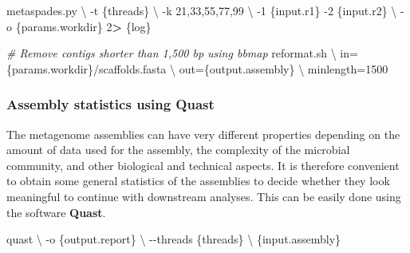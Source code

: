 \documentclass[
]{book}
\newenvironment{Shaded}{\begin{snugshade}}{\end{snugshade}}
\newcommand{\AttributeTok}[1]{\textcolor[rgb]{0.77,0.63,0.00}{#1}}
\newcommand{\CommentTok}[1]{\textcolor[rgb]{0.56,0.35,0.01}{\textit{#1}}}
\newcommand{\DataTypeTok}[1]{\textcolor[rgb]{0.13,0.29,0.53}{#1}}
\newcommand{\DecValTok}[1]{\textcolor[rgb]{0.00,0.00,0.81}{#1}}
\newcommand{\ExtensionTok}[1]{#1}
\newcommand{\NormalTok}[1]{#1}
\newcommand{\OperatorTok}[1]{\textcolor[rgb]{0.81,0.36,0.00}{\textbf{#1}}}
\begin{document}
\small

\begin{Shaded}
\begin{Highlighting}[]
\ExtensionTok{metaspades.py} \DataTypeTok{\textbackslash{}}
    \AttributeTok{{-}t}\NormalTok{ \{threads\} }\DataTypeTok{\textbackslash{}}
    \AttributeTok{{-}k}\NormalTok{ 21,33,55,77,99 }\DataTypeTok{\textbackslash{}}
    \AttributeTok{{-}1}\NormalTok{ \{input.r1\} }\AttributeTok{{-}2}\NormalTok{ \{input.r2\} }\DataTypeTok{\textbackslash{}}
    \AttributeTok{{-}o}\NormalTok{ \{params.workdir\}}
    \DecValTok{2}\OperatorTok{\textgreater{}}\NormalTok{ \{log\}}

\CommentTok{\# Remove contigs shorter than 1,500 bp using bbmap}
\ExtensionTok{reformat.sh} \DataTypeTok{\textbackslash{}}
\NormalTok{    in=\{params.workdir\}/scaffolds.fasta }\DataTypeTok{\textbackslash{}}
\NormalTok{    out=\{output.assembly\} }\DataTypeTok{\textbackslash{}}
\NormalTok{    minlength=1500}
\end{Highlighting}
\end{Shaded}

\normalsize

\hypertarget{assembly-statistics-using-quast}{%
\subsubsection*{Assembly statistics using Quast}\label{assembly-statistics-using-quast}}

The metagenome assemblies can have very different properties depending on the amount of data used for the assembly, the complexity of the microbial community, and other biological and technical aspects. It is therefore convenient to obtain some general statistics of the assemblies to decide whether they look meaningful to continue with downstream analyses. This can be easily done using the software \textbf{Quast}.

\small

\begin{Shaded}
\begin{Highlighting}[]
\ExtensionTok{quast} \DataTypeTok{\textbackslash{}}
    \AttributeTok{{-}o}\NormalTok{ \{output.report\} }\DataTypeTok{\textbackslash{}}
    \AttributeTok{{-}{-}threads}\NormalTok{ \{threads\} }\DataTypeTok{\textbackslash{}}
\NormalTok{    \{input.assembly\}}
\end{Highlighting}
\end{Shaded}
\end{document}
